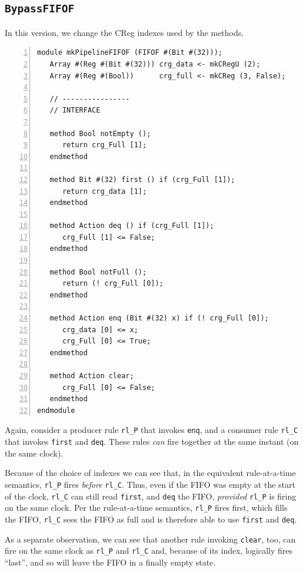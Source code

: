 
\subsection{{\tt BypassFIFOF}}

In this version, we change the CReg indexes used by the methods.

{\footnotesize
\begin{Verbatim}[frame=single, numbers=left]
module mkPipelineFIFOF (FIFOF #(Bit #(32)));
   Array #(Reg #(Bit #(32))) crg_data <- mkCRegU (2);
   Array #(Reg #(Bool))      crg_full <- mkCReg (3, False);

   // ----------------
   // INTERFACE

   method Bool notEmpty ();
      return crg_Full [1];
   endmethod

   method Bit #(32) first () if (crg_Full [1]);
      return crg_data [1];
   endmethod

   method Action deq () if (crg_Full [1]);
      crg_Full [1] <= False;
   endmethod

   method Bool notFull ();
      return (! crg_Full [0]);
   endmethod

   method Action enq (Bit #(32) x) if (! crg_Full [0]);
      crg_data [0] <= x;
      crg_Full [0] <= True;
   endmethod

   method Action clear;
      crg_Full [0] <= False;
   endmethod
endmodule
\end{Verbatim}
}

Again, consider a producer rule \verb|rl_P| that invokes \verb|enq|,
and a consumer rule \verb|rl_C| that invokes \verb|first| and
\verb|deq|.  These rules \emph{can} fire together at the same instant
(on the same clock).

Because of the choice of indexes we can see that, in the equivalent
rule-at-a-time semantics, \verb|rl_P| fires \emph{before} \verb|rl_C|.
Thus, even if the FIFO was empty at the start of the clock,
\verb|rl_C| can still read \verb|first|, and \verb|deq| the FIFO,
\emph{provided} \verb|rl_P| is firing on the same clock.  Per the
rule-at-a-time semantics, \verb|rl_P| fires first, which fills the
FIFO, {\ie} \verb|rl_C| sees the FIFO as full and is therefore able to
use \verb|first| and \verb|deq|.

As a separate observation, we can see that another rule invoking
\verb|clear|, too, can fire on the same clock as \verb|rl_P| and
\verb|rl_C| and, because of its index, logically fires ``last'', and
so will leave the FIFO in a finally empty state.

